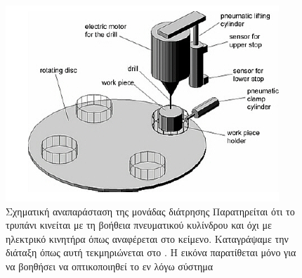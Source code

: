 \documentclass[a4paper,12pt,twoside]{report}
\begin{document}
{				\begin{figure}[hp]
					\centering
					\includegraphics[scale=0.75]{ProcessingStationDrillingModuleThrambo.png}
					\caption{Σχηματική αναπαράσταση της μονάδας διάτρησης \cite{ΤοΦυσικόΣύστημαFestoMPS} {\footnotesize Παρατηρείται ότι το τρυπάνι κινείται με τη βοήθεια πνευματικού κυλίνδρου και όχι με ηλεκτρικό κινητήρα όπως αναφέρεται στο κείμενο. Καταγράψαμε την διάταξη όπως αυτή τεκμηριώνεται στο \cite{FestoMPSProcessingStationManual}. Η εικόνα παρατίθεται μόνο για να βοηθήσει να οπτικοποιηθεί το εν λόγω σύστημα}}
					\label{φωτ:Σχηματική αναπαράσταση της μονάδας διάτρησης από Θράμπο}
				\end{figure}
				
}
\end{document}

